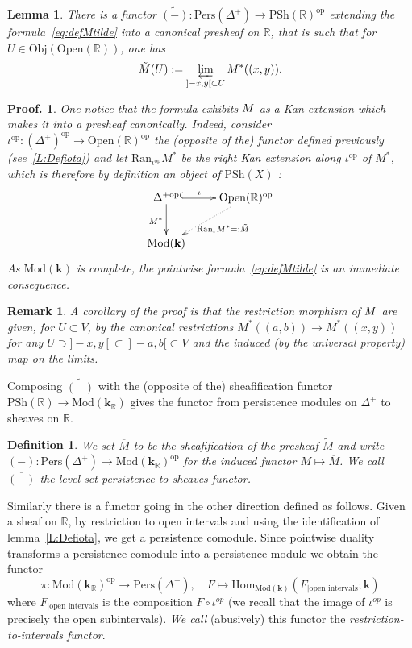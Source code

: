 \documentclass[a4paper, english, 11pt]{article}
\newcommand{\kk}[0]{\textbf{k}}
\newcommand{\Mod}[0]{\text{Mod}}
\newcommand{\Pe}{\text{Pers}}
\newcommand{\0}{\vec{0}}
\newcommand{\R}[0]{\mathbb{R}}
\newcommand{\Obj}[0]{\text{Obj}}
\newcommand{\Ouv}[0]{\mathrm{Open}}
\newcommand{\op}[0]{\text{op}}
\newcommand{\Hom}[0]{\text{Hom}}
\newtheorem*{pf}{Proof.} }
\newtheorem{remark}[prop]{Remark}
\newtheorem{lem}[prop]{Lemma}
\newtheorem{defi}[prop]{Definition}
\begin{document}
\begin{lem} There is a functor $\tilde{(-)}: \Pe(\Delta^+)\to \text{PSh}(\R)^{\op}$   extending the formula~\eqref{eq:defMtilde} into a canonical presheaf on $\R$, that is such that for   $U \in \Obj(\Ouv(\R))$, one has $$\Tilde{M} (U):=  \varprojlim_{]-x,y[\subset U} M^*((x,y)).$$ 
\end{lem}
\begin{pf} One notice that the formula exhibits  $\Tilde{M}$ as a   Kan extension which makes it into a presheaf canonically. Indeed, 
 consider $\iota^\text{op} : (\Delta^{+})^{\op}\longrightarrow \Ouv(\R)^{\op}$ the (opposite of the) functor defined previously (see~\ref{L:Defiota}) and let  $\text{Ran}_{\iota^\text{op}} M^*$  be the right Kan extension along $\iota^\text{op}$ of $M^*$, which is therefore by definition an object of $\text{PSh}(X)$ : 
$$\xymatrix{ \Delta^{+\text{op}}
\ar@{^{(}->}[r]^-{\iota} \ar[d]_{M^*} & \Ouv(\R)^\text{op} \ar@{.>}[dl]^{\text{Ran}_\iota M^* =: \Tilde{M}} \\
\Mod(\kk) & } $$
As $\Mod(\kk)$ is complete,  the pointwise formula~\eqref{eq:defMtilde} is an immediate consequence.  
\end{pf}
\begin{remark}
 A corollary of the proof is that the restriction morphism of $\Tilde{M}$ are given, for $U\subset V$, by the canonical restrictions $M^*((a,b)) \to M^*((x,y))$ for any $ U\supset ]-x,y[ \subset ]-a,b[\subset V$ and the induced (by the universal property) map on the limits. 
\end{remark}
Composing $\tilde{(-)}$ with the (opposite of the) sheafification functor $ \text{PSh}(\R) \to \Mod(\kk_{\R})$ gives the functor from persistence modules on $\Delta^{+}$ to sheaves on $\R$. 
\begin{defi}\label{D:defofBar}
We set $\overline{M}$ to be the sheafification of the presheaf $\tilde{M}$ and write 
$\overline{(-)} : \Pe(\Delta^+)\longrightarrow \Mod (\kk_\R)^{\op}$ for the induced functor $M\mapsto \overline{M}$. We call $\overline{(-)}$ the level-set persistence to sheaves functor. 
\end{defi}
Similarly there is a functor going in the other direction defined as follows. Given a sheaf on $\R$, by restriction to open intervals and using the identification of lemma~\ref{L:Defiota}, we get a persistence comodule. Since pointwise duality transforms a persistence comodule into a persistence module we obtain the functor 
\begin{equation}
 \label{eq:defpi}  \pi : \Mod(\kk_\R)^{\op} \longrightarrow \Pe(\Delta^+), \quad F\mapsto \Hom_{\Mod(\kk)}(F_{ | \text{open intervals}};\kk)
\end{equation}
where $F_{ | \text{open intervals}}$ is the composition $F\circ \iota^{op}$ (we recall that the image of $\iota^{op}$ is precisely the open subintervals).
\emph{We call} (abusively) this functor the \emph{restriction-to-intervals functor}. 
\end{document}

